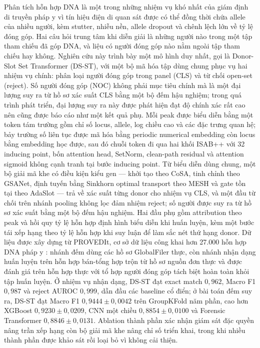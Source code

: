 \documentclass[12pt,a4paper]{article}
\begin{document}
Phân tích hỗn hợp DNA là một trong những nhiệm vụ khó nhất của giám định di truyền pháp y vì tín hiệu điện di quan sát được có thể đồng thời chứa allele của nhiều người, kèm stutter, nhiễu nền, allele dropout và chênh lệch lớn về tỷ lệ đóng góp. Hai câu hỏi trung tâm khi diễn giải là những người nào trong một tập tham chiếu đã góp DNA, và liệu có người đóng góp nào nằm ngoài tập tham chiếu hay không. Nghiên cứu này trình bày một mô hình duy nhất, gọi là Donor-Slot Set Transformer (DS-ST), với một bộ mã hóa tập dùng chung phục vụ hai nhiệm vụ chính: phân loại người đóng góp trong panel (CLS) và từ chối open-set (reject). Số người đóng góp (NOC) không phải mục tiêu chính mà là một đại lượng suy ra từ hồ sơ xác suất CLS bằng một bộ đếm hậu nghiệm; trong quá trình phát triển, đại lượng suy ra này được phát hiện đạt độ chính xác rất cao nên cũng được báo cáo như một kết quả phụ. Mỗi peak được biểu diễn bằng một token tám trường gồm chỉ số locus, allele, log chiều cao và các đặc trưng quan hệ; bảy trường số liên tục được mã hóa bằng periodic numerical embedding còn locus bằng embedding học được, sau đó chuỗi token đi qua hai khối ISAB++ với 32 inducing point, bốn attention head, SetNorm, clean-path residual và attention sigmoid không cạnh tranh tại bước inducing point. Từ biểu diễn dùng chung, một bộ giải mã khe có điều kiện kiểu gen — khởi tạo theo CoSA, tinh chỉnh theo GSANet, định tuyến bằng Sinkhorn optimal transport theo MESH và gate tồn tại theo AdaSlot — trả về xác suất từng donor cho nhiệm vụ CLS, và một đầu từ chối trên nhánh pooling không lọc đảm nhiệm reject; số người được suy ra từ hồ sơ xác suất bằng một bộ đếm hậu nghiệm. Hai đầu phụ gồm attribution theo peak và hồi quy tỷ lệ hỗn hợp định hình biểu diễn khi huấn luyện, kèm một bước tái xếp hạng theo tỷ lệ hỗn hợp khi suy luận để làm sắc nét thứ hạng donor. Dữ liệu được xây dựng từ PROVEDIt, cơ sở dữ liệu công khai hơn 27.000 hỗn hợp DNA pháp y \cite{provedit2018,proveditweb}: nhánh đếm dùng các hồ sơ GlobalFiler thực, còn nhánh nhận dạng huấn luyện trên hỗn hợp bán-tổng hợp trộn từ hồ sơ nguồn đơn thực và được đánh giá trên hỗn hợp thực với tổ hợp người đóng góp tách biệt hoàn toàn khỏi tập huấn luyện. Ở nhiệm vụ nhận dạng, DS-ST đạt exact match \(0,962\), Macro F1 \(0,987\) và reject AUROC \(0,999\), dẫn đầu các baseline cổ điển; ở bài toán đếm suy ra, DS-ST đạt Macro F1 \(0,9444\pm0,0042\) trên GroupKFold năm phần, cao hơn XGBoost \(0,9230\pm0,0209\), CNN một chiều \(0,8854\pm0,0100\) và Forensic Transformer \(0,8846\pm0,0131\). Ablation thành phần xác nhận giám sát đặc quyền nâng trần xếp hạng còn bộ giải mã khe nâng chỉ số triển khai, trong khi nhiều thành phần được khảo sát rồi loại bỏ vì không cải thiện.
\end{document}
